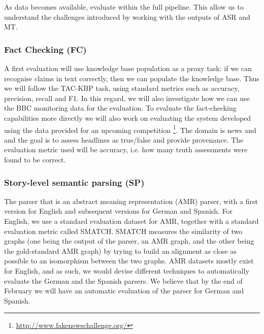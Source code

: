 As \SUMMA data becomes available,  evaluate  within the full pipeline. This  allow us to understand the challenges introduced by working with the outputs of ASR and MT.

\subsubsection{Fact Checking (FC)}

A first evaluation will use knowledge base population as a proxy task: if we can recognise claims in text correctly, then we can populate the knowledge base. Thus we will follow the TAC-KBP task, using standard metrics such as accuracy, precision, recall and F1. In this regard, we will also investigate how we can use the BBC monitoring data for the evaluation.
To evaluate the fact-checking capabilities more directly we will also work on evaluating the system developed using the data provided for an upcoming competition%
\footnote{\url{http://www.fakenewschallenge.org/}}. The domain is news and and the goal is to assess headlines as true/false and provide provenance. The evaluation metric used will be accuracy, i.e. how many truth assessments were found to be correct.

\subsubsection{Story-level semantic parsing (SP)}

The parser that  is an abstract meaning representation (AMR) parser, with a first version for English and subsequent versions for German and Spanish. For English, we use a standard evaluation dataset for AMR, together with a standard evaluation metric called SMATCH. SMATCH measures the similarity of two graphs (one being the output of the parser, an AMR graph, and the other being the gold-standard AMR graph) by trying to build an alignment as close as possible to an isomorphism between the two graphs. 
AMR datasets mostly exist for English, and as such, we would devise different techniques to automatically evaluate the German and the Spanish parsers.
We believe that by the end of February we will have an automatic evaluation of the parser for German and Spanish. 

